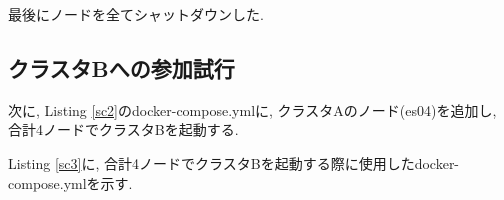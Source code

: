 \documentclass[a4j,12pt,]{jarticle}
\begin{document}
最後にノードを全てシャットダウンした.

\subsection{クラスタBへの参加試行}

次に, Listing \ref{sc2}のdocker-compose.ymlに, クラスタAのノード(es04)を追加し, 合計4ノードでクラスタBを起動する.

Listing \ref{sc3}に, 合計4ノードでクラスタBを起動する際に使用したdocker-compose.ymlを示す.


\begin{figure}[H]
  \begin{center}

\end{center}
\end{figure}
\end{document}

